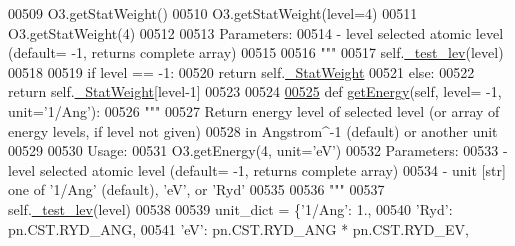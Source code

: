 \begin{DoxyCode}
{{00509 \textcolor{stringliteral}{            O3.getStatWeight()}
00510 \textcolor{stringliteral}{            O3.getStatWeight(level=4)}
00511 \textcolor{stringliteral}{            O3.getStatWeight(4)}
00512 \textcolor{stringliteral}{                      }
00513 \textcolor{stringliteral}{        Parameters:}
00514 \textcolor{stringliteral}{            - level  selected atomic level (default= -1, returns complete array)}
00515 \textcolor{stringliteral}{            }
00516 \textcolor{stringliteral}{        """}
00517         self.\hyperlink{classpyneb_1_1core_1_1pynebcore_1_1___atom_data_ascii_a2b36467278900c759761366fe5b69c37}{\_test\_lev}(level)
00518         
00519         \textcolor{keywordflow}{if} level == -1:
00520             \textcolor{keywordflow}{return} self.\hyperlink{classpyneb_1_1core_1_1pynebcore_1_1___atom_data_ascii_ac3e956654089ac966a877dbaa003e3ea}{\_StatWeight}
00521         \textcolor{keywordflow}{else}:
00522             \textcolor{keywordflow}{return} self.\hyperlink{classpyneb_1_1core_1_1pynebcore_1_1___atom_data_ascii_ac3e956654089ac966a877dbaa003e3ea}{\_StatWeight}[level-1]
00523         
00524     
\hypertarget{pynebcore_8py_source_l00525}{}\hyperlink{classpyneb_1_1core_1_1pynebcore_1_1___atom_data_ascii_af747dc13a858a4eacc6107aedad89bd0}{00525}     \textcolor{keyword}{def }\hyperlink{classpyneb_1_1core_1_1pynebcore_1_1___atom_data_ascii_af747dc13a858a4eacc6107aedad89bd0}{getEnergy}(self, level= -1, unit='1/Ang'):
00526         \textcolor{stringliteral}{"""}
00527 \textcolor{stringliteral}{        Return energy level of selected level (or array of energy levels, if level not given) }
00528 \textcolor{stringliteral}{            in Angstrom^-1 (default) or another unit}
00529 \textcolor{stringliteral}{        }
00530 \textcolor{stringliteral}{        Usage:}
00531 \textcolor{stringliteral}{            O3.getEnergy(4, unit='eV')}
00532 \textcolor{stringliteral}{        Parameters:}
00533 \textcolor{stringliteral}{            - level  selected atomic level (default= -1, returns complete array)}
00534 \textcolor{stringliteral}{            - unit   [str] one of '1/Ang' (default), 'eV', or 'Ryd'    }
00535 \textcolor{stringliteral}{            }
00536 \textcolor{stringliteral}{        """}
00537         self.\hyperlink{classpyneb_1_1core_1_1pynebcore_1_1___atom_data_ascii_a2b36467278900c759761366fe5b69c37}{\_test\_lev}(level)
00538 
00539         unit\_dict = \{\textcolor{stringliteral}{'1/Ang'}: 1.,
00540                      \textcolor{stringliteral}{'Ryd'}: pn.CST.RYD\_ANG,
00541                      \textcolor{stringliteral}{'eV'}: pn.CST.RYD\_ANG * pn.CST.RYD\_EV,
}}
\end{DoxyCode}

